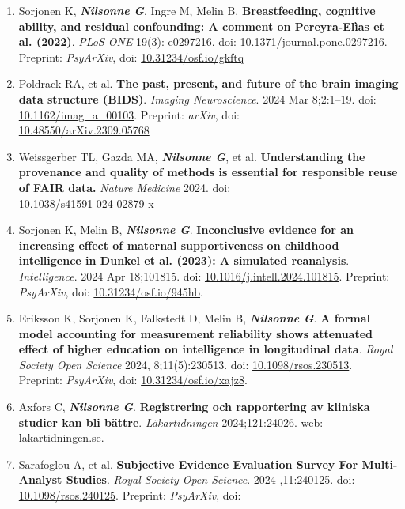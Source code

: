 \documentclass[10pt]{article}
\begin{document}
\begin{enumerate}[nolistsep]
\item Sorjonen K, \textbf{\textit{Nilsonne G}}, Ingre M, Melin B. \textbf{Breastfeeding, cognitive ability, and residual confounding: A comment on Pereyra-Elìas et al. (2022)}.  \emph{PLoS ONE} 19(3): e0297216. doi: \href{https://10.1371/journal.pone.0297216}{10.1371/journal.pone.0297216}. Preprint: \emph{PsyArXiv}, doi: \href{https://doi.org/10.31234/osf.io/gkftq}{10.31234/osf.io/gkftq}
\item Poldrack RA, et al. \textbf{The past, present, and future of the brain imaging data structure (BIDS)}. \emph{Imaging Neuroscience}. 2024 Mar 8;2:1–19. doi: \href{https://doi.org/10.1162/imag\_a\_00103}{10.1162/imag\_a\_00103}. Preprint: \emph{arXiv}, doi: \\
\href{https://doi.org/10.48550/arXiv.2309.05768}{10.48550/arXiv.2309.05768}
\item Weissgerber TL, Gazda MA, \textbf{\textit{Nilsonne G}}, et al. \textbf{Understanding the provenance and quality of methods is essential for responsible reuse of FAIR data.} \emph{Nature Medicine} 2024. doi: \\
\href{https://doi.org/10.1038/s41591-024-02879-x}{10.1038/s41591-024-02879-x}
\item Sorjonen K, Melin B, \textbf{\textit{Nilsonne G}}. \textbf{Inconclusive evidence for an increasing effect of maternal supportiveness on childhood intelligence in Dunkel et al. (2023): A simulated reanalysis}. \emph{Intelligence}. 2024 Apr 18;101815. doi: \href{https://doi.org/10.1016/j.intell.2024.101815}{10.1016/j.intell.2024.101815}. Preprint:  \emph{PsyArXiv}, doi: \href{https://doi.org/10.31234/osf.io/945hb}{10.31234/osf.io/945hb}.
\item Eriksson K, Sorjonen K, Falkstedt D, Melin B, \textbf{\textit{Nilsonne G}}. \textbf{A formal model accounting for measurement reliability shows attenuated effect of higher education on intelligence in longitudinal data}. \emph{Royal Society Open Science} 2024, 8;11(5):230513. doi: \href{https://doi.org/10.1098/rsos.230513}{10.1098/rsos.230513}. Preprint: \emph{PsyArXiv}, doi: \href{https://doi.org/10.31234/osf.io/xajz8}{10.31234/osf.io/xajz8}.
\item Axfors C, \textbf{\textit{Nilsonne G}}. \textbf{Registrering och rapportering av kliniska studier kan bli bättre}. \emph{Läkartidningen} 2024;121:24026. web: \href{https://lakartidningen.se/klinik-och-vetenskap-1/kommentar/2024/06/registrering-och-rapportering-av-kliniska-studier-kan-bli-battre/}{lakartidningen.se}.
\item Sarafoglou A, et al. \textbf{Subjective Evidence Evaluation Survey For Multi-Analyst Studies}. \emph{Royal Society Open Science}. 2024 ,11:240125. doi: \href{https://doi.org/10.1098/rsos.240125}{10.1098/rsos.240125}. Preprint: \emph{PsyArXiv}, doi: \\

\end{enumerate}
\end{document}
